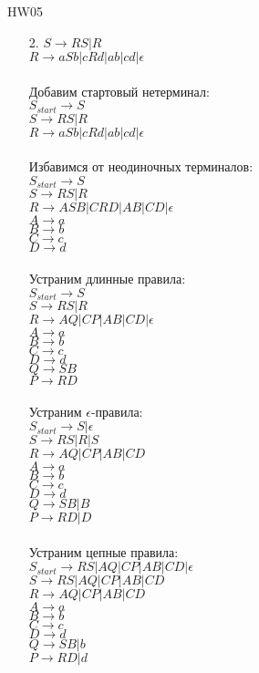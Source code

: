 \documentclass[12pt]{article}
\begin{document}
\begin{center} {\LARGE HW05} \end{center}

\bigskip

\begin{enumerate}
\item[2.]
$S \to RS|R$\\
$R \to aSb|cRd|ab|cd|\epsilon$\\\\
Добавим стартовый нетерминал:\\
$S_{start} \to S$\\
$S \to RS|R$\\
$R \to aSb|cRd|ab|cd|\epsilon$\\\\
Избавимся от неодиночных терминалов:\\
$S_{start} \to S$\\
$S \to RS|R$\\
$R \to ASB|CRD|AB|CD|\epsilon$\\
$A \to a$\\
$B \to b$\\
$C \to c$\\
$D \to d$\\\\
Устраним длинные правила:\\
$S_{start} \to S$\\
$S \to RS|R$\\
$R \to AQ|CP|AB|CD|\epsilon$\\
$A \to a$\\
$B \to b$\\
$C \to c$\\
$D \to d$\\
$Q \to SB$\\
$P \to RD$\\\\
Устраним $\epsilon$-правила:\\
$S_{start} \to S|\epsilon$\\
$S \to RS|R|S$\\
$R \to AQ|CP|AB|CD$\\
$A \to a$\\
$B \to b$\\
$C \to c$\\
$D \to d$\\
$Q \to SB|B$\\
$P \to RD|D$\\\\
Устраним цепные правила:\\
$S_{start}\to RS|AQ|CP|AB|CD|\epsilon$\\
$S \to RS|AQ|CP|AB|CD$\\
$R \to AQ|CP|AB|CD$\\
$A \to a$\\
$B \to b$\\
$C \to c$\\
$D \to d$\\
$Q \to SB|b$\\
$P \to RD|d$\\


\end{enumerate}
\end{document}
